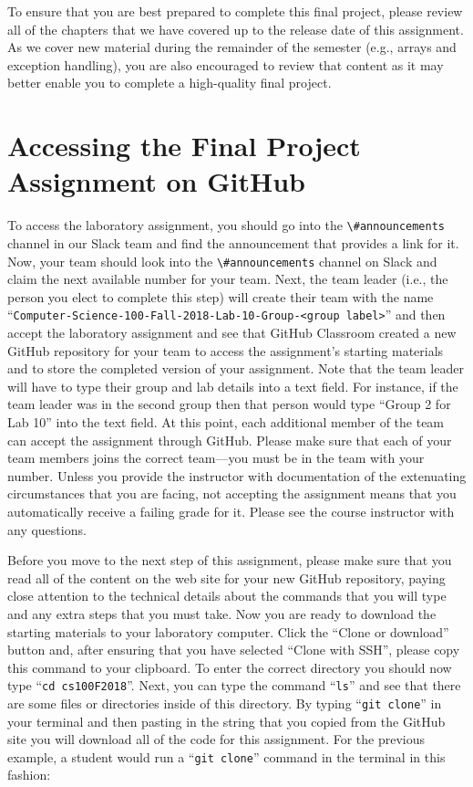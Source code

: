 \documentclass[11pt]{article}
\newcommand{\command}[1]{``\lstinline{#1}''}
\newcommand{\channel}[1]{\lstinline{#1}}
\begin{document}
To ensure that you are best prepared to complete this final project, please
review all of the chapters that we have covered up to the release date of this
assignment. As we cover new material during the remainder of the semester (e.g.,
arrays and exception handling), you are also encouraged to review that content
as it may better enable you to complete a high-quality final project.

\section*{Accessing the Final Project Assignment on GitHub}

To access the laboratory assignment, you should go into the
\channel{\#announcements} channel in our Slack team and find the announcement
that provides a link for it. Now, your team should look into the
\channel{\#announcements} channel on Slack and claim the next available number
for your team. Next, the team leader (i.e., the person you elect to complete
this step) will create their team with the name
\command{Computer-Science-100-Fall-2018-Lab-10-Group-<group label>} and then
accept the laboratory assignment and see that GitHub Classroom created a new
GitHub repository for your team to access the assignment's starting materials
and to store the completed version of your assignment. Note that the team leader
will have to type their group and lab details into a text field. For instance,
if the team leader was in the second group then that person would type ``Group 2
for Lab 10'' into the text field. At this point, each additional member of the
team can accept the assignment through GitHub. Please make sure that each of
your team members joins the correct team---you must be in the team with your
number. Unless you provide the instructor with documentation of the extenuating
circumstances that you are facing, not accepting the assignment means that you
automatically receive a failing grade for it. Please see the course instructor
with any questions.

Before you move to the next step of this assignment, please make sure that you
read all of the content on the web site for your new GitHub repository, paying
close attention to the technical details about the commands that you will type
and any extra steps that you must take. Now you are ready to download the
starting materials to your laboratory computer. Click the ``Clone or download''
button and, after ensuring that you have selected ``Clone with SSH'', please
copy this command to your clipboard. To enter the correct directory you should
now type \command{cd cs100F2018}. Next, you can type the command \command{ls}
and see that there are some files or directories inside of this directory. By
typing \command{git clone} in your terminal and then pasting in the string that
you copied from the GitHub site you will download all of the code for this
assignment. For the previous example, a student would run a \command{git clone}
command in the terminal in this fashion:
\end{document}
